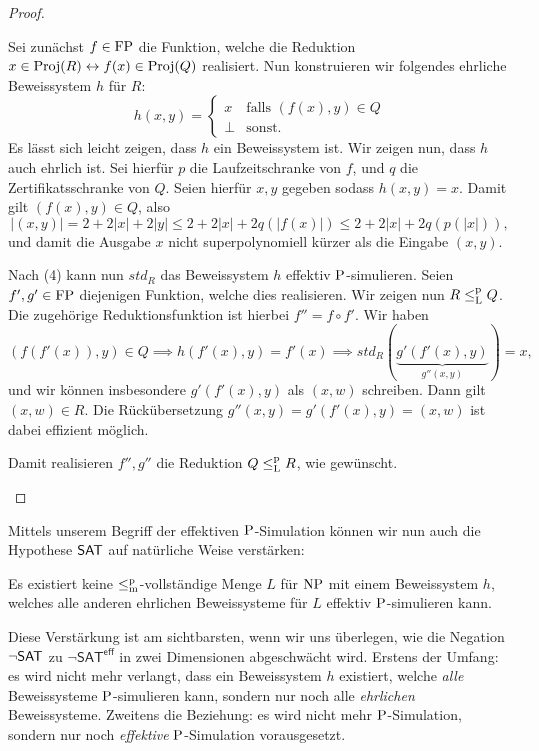 \begin{proof}
\begin{prooflist}
        Sei zunächst $f\in\FP$ die Funktion, welche die Reduktion $x\in \Proj(R)\leftrightarrow f(x)\in\Proj(Q)$ realisiert.
        Nun konstruieren wir folgendes ehrliche Beweissystem $h$ für $R$:
        \[ h(x,y) = \begin{cases} x & \text{falls $(f(x), y)\in Q$}\\ \bot & \text{sonst}. \end{cases}\]
        Es lässt sich leicht zeigen, dass $h$ ein Beweissystem ist.
        Wir zeigen nun, dass $h$ auch ehrlich ist. Sei hierfür $p$ die Laufzeitschranke von $f$, und $q$ die Zertifikatsschranke von $Q$.
        Seien hierfür $x, y$ gegeben sodass $h(x,y)=x$. Damit gilt $(f(x), y)\in Q$, also
        \[ |(x,y)| = 2+2|x|+2|y| \leq 2+2|x|+2q(|f(x)|) \leq 2+ 2|x|+ 2q(p(|x|)), \]
        und damit die Ausgabe $x$ nicht superpolynomiell kürzer als die Eingabe $(x,y)$.

        Nach (4) kann nun $\mathit{std}_R$ das Beweissystem $h$ effektiv $\P$-simulieren.
        Seien $f', g'\in\FP$ diejenigen Funktion, welche dies realisieren.
        Wir zeigen nun $R\leqlp Q$. Die zugehörige Reduktionsfunktion ist hierbei $f''= f\circ f'$. 
        Wir haben
        \[ (f(f'(x)), y)\in Q \implies h(f'(x),y)=f'(x) \implies \mathit{std}_R(\underbrace{g'(f'(x), y)}_{g''(x,y)})=x, \]
        und wir können insbesondere $g'(f'(x), y)$ als $(x, w)$ schreiben. Dann gilt $(x,w)\in R$.
        Die Rückübersetzung $g''(x,y)=g'(f'(x), y)=(x,w)$ ist dabei effizient möglich.

        Damit realisieren $f'', g''$ die Reduktion $Q\leqlp R$, wie gewünscht.
    \end{prooflist}
\end{proof}

Mittels unserem Begriff der effektiven $\P$-Simulation können wir nun auch die Hypothese $\hSAT$ auf natürliche Weise verstärken:
\begin{conjecture}
    Es existiert keine $\leqmp$-vollständige Menge $L$ für $\NP$ mit einem Beweissystem $h$, welches alle anderen ehrlichen Beweissysteme für $L$ effektiv $\P$-simulieren kann. 
\end{conjecture}
Diese Verstärkung ist am sichtbarsten, wenn wir uns überlegen, wie die Negation $\neg\hSAT$ zu $\neg\mathsf{SAT^{eff}}$ in zwei Dimensionen abgeschwächt wird.
Erstens der Umfang: es wird nicht mehr verlangt, dass ein Beweissystem $h$ existiert, welche \emph{alle} Beweissysteme $\P$-simulieren kann, sondern nur noch alle \emph{ehrlichen} Beweissysteme.
Zweitens die Beziehung: es wird nicht mehr $\P$-Simulation, sondern nur noch \emph{effektive} $\P$-Simulation vorausgesetzt.

